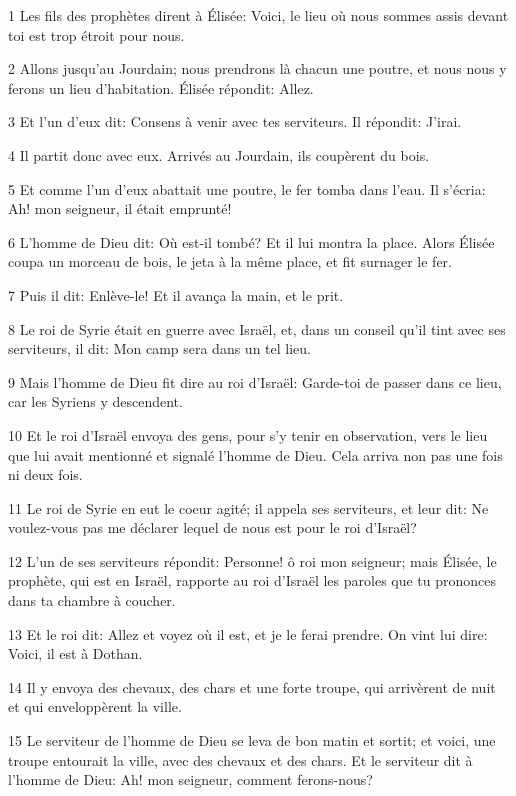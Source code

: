 \par 1 Les fils des prophètes dirent à Élisée: Voici, le lieu où nous sommes assis devant toi est trop étroit pour nous.
\par 2 Allons jusqu'au Jourdain; nous prendrons là chacun une poutre, et nous nous y ferons un lieu d'habitation. Élisée répondit: Allez.
\par 3 Et l'un d'eux dit: Consens à venir avec tes serviteurs. Il répondit: J'irai.
\par 4 Il partit donc avec eux. Arrivés au Jourdain, ils coupèrent du bois.
\par 5 Et comme l'un d'eux abattait une poutre, le fer tomba dans l'eau. Il s'écria: Ah! mon seigneur, il était emprunté!
\par 6 L'homme de Dieu dit: Où est-il tombé? Et il lui montra la place. Alors Élisée coupa un morceau de bois, le jeta à la même place, et fit surnager le fer.
\par 7 Puis il dit: Enlève-le! Et il avança la main, et le prit.
\par 8 Le roi de Syrie était en guerre avec Israël, et, dans un conseil qu'il tint avec ses serviteurs, il dit: Mon camp sera dans un tel lieu.
\par 9 Mais l'homme de Dieu fit dire au roi d'Israël: Garde-toi de passer dans ce lieu, car les Syriens y descendent.
\par 10 Et le roi d'Israël envoya des gens, pour s'y tenir en observation, vers le lieu que lui avait mentionné et signalé l'homme de Dieu. Cela arriva non pas une fois ni deux fois.
\par 11 Le roi de Syrie en eut le coeur agité; il appela ses serviteurs, et leur dit: Ne voulez-vous pas me déclarer lequel de nous est pour le roi d'Israël?
\par 12 L'un de ses serviteurs répondit: Personne! ô roi mon seigneur; mais Élisée, le prophète, qui est en Israël, rapporte au roi d'Israël les paroles que tu prononces dans ta chambre à coucher.
\par 13 Et le roi dit: Allez et voyez où il est, et je le ferai prendre. On vint lui dire: Voici, il est à Dothan.
\par 14 Il y envoya des chevaux, des chars et une forte troupe, qui arrivèrent de nuit et qui enveloppèrent la ville.
\par 15 Le serviteur de l'homme de Dieu se leva de bon matin et sortit; et voici, une troupe entourait la ville, avec des chevaux et des chars. Et le serviteur dit à l'homme de Dieu: Ah! mon seigneur, comment ferons-nous?
